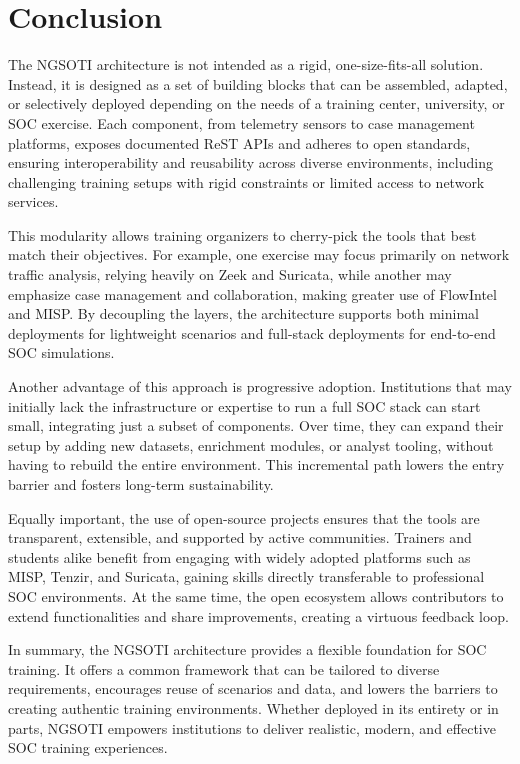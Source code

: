 \documentclass[10pt,a4paper]{report}
\begin{document}
\section{Conclusion}
The NGSOTI architecture is not intended as a rigid, one-size-fits-all solution.
Instead, it is designed as a set of building blocks that can be assembled,
adapted, or selectively deployed depending on the needs of a training center,
university, or SOC exercise. Each component, from telemetry sensors to case
management platforms, exposes documented ReST APIs and adheres to open
standards, ensuring interoperability and reusability across diverse
environments, including challenging training setups with rigid constraints or
limited access to network services.

This modularity allows training organizers to cherry-pick the tools that best
match their objectives. For example, one exercise may focus primarily on network
traffic analysis, relying heavily on Zeek and Suricata, while another may
emphasize case management and collaboration, making greater use of FlowIntel and
MISP. By decoupling the layers, the architecture supports both minimal
deployments for lightweight scenarios and full-stack deployments for end-to-end
SOC simulations.

Another advantage of this approach is progressive adoption. Institutions that
may initially lack the infrastructure or expertise to run a full SOC stack can
start small, integrating just a subset of components. Over time, they can expand
their setup by adding new datasets, enrichment modules, or analyst tooling,
without having to rebuild the entire environment. This incremental path lowers
the entry barrier and fosters long-term sustainability.

Equally important, the use of open-source projects ensures that the tools are
transparent, extensible, and supported by active communities. Trainers and
students alike benefit from engaging with widely adopted platforms such as MISP,
Tenzir, and Suricata, gaining skills directly transferable to professional SOC
environments. At the same time, the open ecosystem allows contributors to extend
functionalities and share improvements, creating a virtuous feedback loop.

In summary, the NGSOTI architecture provides a flexible foundation for SOC
training. It offers a common framework that can be tailored to diverse
requirements, encourages reuse of scenarios and data, and lowers the barriers to
creating authentic training environments. Whether deployed in its entirety or in
parts, NGSOTI empowers institutions to deliver realistic, modern, and effective
SOC training experiences.

\printbibliography
\end{document}
